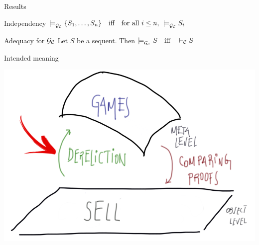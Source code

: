 \documentclass[9pt]{beamer}
\begin{document}
\begin{frame}{Results}

\begin{block}{Independency}
$\models^{}_{\mathcal{G}_{\mathcal{C}}}\{S_1,\ldots,S_n\}\quad\mbox{iff} \quad\text{for all $i\leq n$, }\models^{}_{\mathcal{G}_{\mathcal{C}}}S_i$
\end{block}
\bigskip 
\begin{block}{Adequacy for $\mathcal{G}_{\mathcal{C}}$}
Let $S$ be a sequent. Then 
$\models^{}_{\mathcal{G}_{\mathcal{C}}}S\quad\mbox{iff}\quad\vdash_\mathcal{C} S$
\end{block}

\end{frame}


\begin{frame}{Intended meaning}
\begin{center}
\includegraphics[scale=0.35]{../figs/LF12}
\end{center}
\end{frame}
\end{document}
